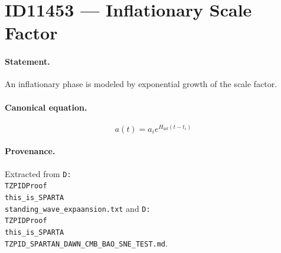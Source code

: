 \section*{ID11453 --- Inflationary Scale Factor}

\paragraph{Statement.}
An inflationary phase is modeled by exponential growth of the scale factor.

\paragraph{Canonical equation.}
\[
a(t)=a_i e^{H_{\mathrm{inf}}(t-t_i)}
\]

\paragraph{Provenance.}
Extracted from \texttt{D:\\TZPIDProof\\this\_is\_SPARTA\\standing\_wave\_expaansion.txt} and \texttt{D:\\TZPIDProof\\this\_is\_SPARTA\\TZPID\_SPARTAN\_DAWN\_CMB\_BAO\_SNE\_TEST.md}.
